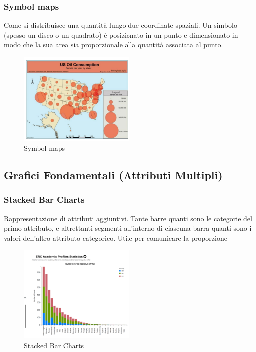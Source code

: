 \subsubsection{Symbol maps}
Come si distribuisce una quantità lungo due coordinate spaziali. Un simbolo (spesso un disco o un quadrato) è posizionato 
in un punto e dimensionato in modo che la sua area sia proporzionale alla quantità associata al punto.
\begin{figure}[H]
    \centering
    \includegraphics[width=0.5\textwidth]{images/SymbolMaps.png} 
    \caption{Symbol maps}
    \label{fig:immagine}
\end{figure}

\subsection{Grafici Fondamentali (Attributi Multipli)}
\subsubsection{Stacked Bar Charts}
Rappresentazione di attributi aggiuntivi. 
Tante barre quanti sono le categorie del primo attributo, e altrettanti segmenti all'interno di ciascuna barra quanti sono i valori dell'altro attributo categorico. 
Utile per comunicare la proporzione
\begin{figure}[H]
    \centering
    \includegraphics[width=0.5\textwidth]{images/StackedBar.png} %
    \caption{Stacked Bar Charts}
    \label{fig:immagine}
\end{figure}
